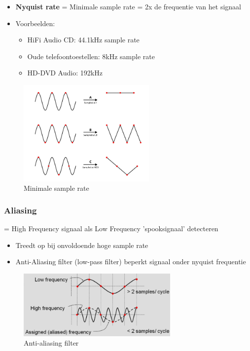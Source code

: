 \documentclass{article}
\newcommand{\bold}[1]{\textbf{#1}}
\begin{document}
\begin{itemize}
    \item \bold{Nyquist rate} = Minimale sample rate = 2x de frequentie van het signaal
    \item Voorbeelden:
    \begin{itemize}
        \item HiFi Audio CD: 44.1kHz sample rate
        \item Oude telefoontoestellen: 8kHz sample rate
        \item HD-DVD Audio: 192kHz
    \end{itemize}
\end{itemize}

\begin{figure}[H]
    \centering
    \includegraphics[width=0.6\textwidth]{Screenshot_20200224_121935.png}
    \caption{Minimale sample rate}
\end{figure}

\subsubsection{Aliasing}
= High Frequency signaal als Low Frequency 'spooksignaal' detecteren 
\begin{itemize}
    \item Treedt op bij onvoldoende hoge sample rate
    \item Anti-Aliasing filter (low-pass filter) beperkt signaal onder nyquist frequentie
\end{itemize}

\begin{figure}[H]
    \centering
    \includegraphics[width=0.7\textwidth]{Screenshot_20200224_122204.png}
    \caption{Anti-aliasing filter}
\end{figure}
\end{document}
